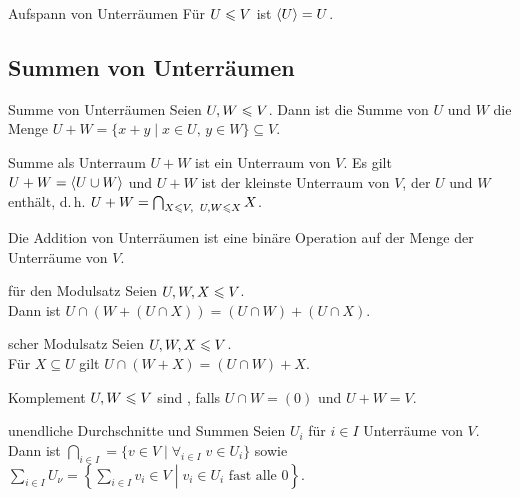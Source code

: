 \begin{Lemma}{Aufspann von Unterräumen}
    Für $U \leqslant V$ ist $\langle U \rangle = U$.
\end{Lemma}

\subsection{%
    Summen von Unterräumen%
}

\begin{Def}{Summe von Unterräumen}
    Seien $U, W \leqslant V$. Dann ist die Summe von $U$ und $W$ die Menge
    $U + W = \{x + y \;|\; x \in U,\, y \in W\} \subseteq V$.
\end{Def}

\begin{Satz}{Summe als Unterraum}
    $U + W$ ist ein Unterraum von $V$.
    Es gilt $U + W = \langle U \cup W \rangle$
    und $U + W$ ist der kleinste Unterraum von $V$, der $U$ und $W$ enthält,
    d.\,h. $U + W = \bigcap_{X \leqslant V,\;\; U, W \leqslant X} X$.
\end{Satz}

\begin{Kor}
    Die Addition von Unterräumen ist eine binäre Operation auf der Menge
    der Unterräume von $V$.
\end{Kor}

\pagebreak

\begin{Lemma}{für den Modulsatz}
    Seien $U, W, X \leqslant V$. \\
    Dann ist $U \cap (W + (U \cap X)) = (U \cap W) + (U \cap X)$.
\end{Lemma}

\begin{Satz}{scher Modulsatz}
    Seien $U, W, X \leqslant V$. \\
    Für $X \subseteq U$ gilt $U \cap (W + X) = (U \cap W) + X$.
\end{Satz}

\begin{Def}{Komplement}
    $U, W \leqslant V$ sind , falls
    $U \cap W = (0)$ und $U + W = V$.
\end{Def}

\begin{Def}{unendliche Durchschnitte und Summen}
    Seien $U_i$ für $i \in I$ Unterräume von $V$. \\
    Dann ist $\bigcap_{i \in I} =
    \{v \in V \;|\; \forall_{i \in I}\; v \in U_i\}$
    sowie $\sum_{i \in I} U_\nu =
    \left\{\left. \sum_{i \in I} v_i \in V \;\right|\;
    v_i \in U_i \text{ fast alle } 0 \right\}$.
\end{Def}

